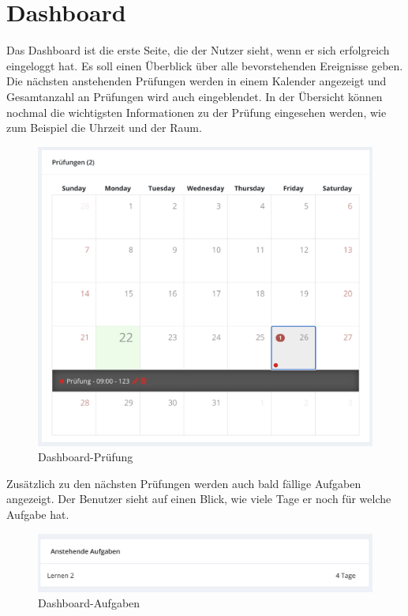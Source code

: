\section{Dashboard}\label{sec:dashboard}
Das Dashboard ist die erste Seite, die der Nutzer sieht, wenn er sich erfolgreich eingeloggt hat. Es soll einen Überblick über alle bevorstehenden Ereignisse geben.
Die nächsten anstehenden Prüfungen werden in einem Kalender angezeigt und Gesamtanzahl an Prüfungen wird auch eingeblendet. In der Übersicht können nochmal die wichtigsten 
Informationen zu der Prüfung eingesehen werden, wie zum Beispiel die Uhrzeit und der Raum. 
\begin{figure}[h]
    \centering
    \includegraphics[width=.7\textwidth]{img/Dashboard_3.png}
    \caption{Dashboard-Prüfung}
    \label{fig:Dashboardansicht}
\end{figure}
Zusätzlich zu den nächsten Prüfungen werden auch bald fällige Aufgaben angezeigt. Der Benutzer sieht auf einen Blick, wie viele Tage er noch für welche Aufgabe hat.
\begin{figure}[h]
    \centering
    \includegraphics[width=.7\textwidth]{img/Dashboard_4.png}
    \caption{Dashboard-Aufgaben}
    \label{fig:Dashboardaufgaben}
\end{figure}

